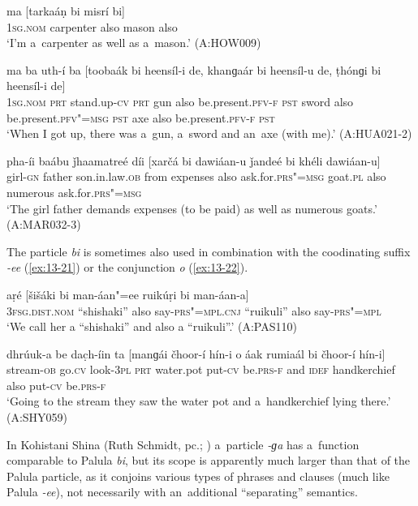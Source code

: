 \begin{exe}
\ex
\label{ex:13-18}
\gll ma [tarkaáṇ bi misrí bi]  \\
\textsc{1sg.nom} carpenter also mason also \\
\glt `I'm a~carpenter as well as a~mason.' (A:HOW009)

\ex
\label{ex:13-19}
\gll ma ba uth-í ba [toobaák bi heensíl-i de, khanɡaár bi heensíl-u de, ṭhónɡi bi heensíl-i de] \\
\textsc{1sg.nom} \textsc{prt} stand.up-\textsc{cv} \textsc{prt} gun also  be.present.\textsc{pfv-f} \textsc{pst} sword also be.present.\textsc{pfv"=msg } \textsc{pst} axe also be.present.\textsc{pfv-f } \textsc{pst} \\
\glt `When I got up, there was a~gun, a~sword and an~axe (with me).' (A:HUA021-2)

\ex
\label{ex:13-20}
\gll pha-íi baábu ǰhaamatreé díi [xarčá bi dawiáan-u ǰandeé bi khéli dawiáan-u]  \\
girl-\textsc{gn} father son.in.law.\textsc{ob} from expenses also  ask.for.\textsc{prs"=msg} goat.\textsc{pl} also numerous ask.for.\textsc{prs"=msg} \\
\glt `The girl father demands expenses (to be paid) as well as numerous goats.' (A:MAR032-3) 
\end{exe}

The particle \textit{bi} is sometimes also used in combination with the coodinating suffix \textit{-ee} (\ref{ex:13-21}) or the conjunction \textit{o} (\ref{ex:13-22}).

\begin{exe}
\ex
\label{ex:13-21}
\gll aṛé  [šišáki  bi man-áan"=ee  ruikúṛi bi man-áan-a] \\
\textsc{3fsg.dist.nom} ``shishaki'' also say-\textsc{prs"=mpl.cnj}  ``ruikuli'' also say-\textsc{prs"=mpl} \\
\glt `We call her a ``shishaki'' and also a ``ruikuli''.' (A:PAS110)

\ex
\label{ex:13-22}
\gll dhrúuk-a be dac̣h-íin ta [manɡái čhoor-í hín-i o áak rumiaál bi čhoor-í hín-i]  \\
stream-\textsc{ob} go.\textsc{cv} look-\textsc{3pl} \textsc{prt} water.pot put-\textsc{cv}  be.\textsc{prs-f} and \textsc{idef } handkerchief also put-\textsc{cv} be.\textsc{prs-f } \\
\glt `Going to the stream they saw the water pot and a~handkerchief lying there.' (A:SHY059) 
\end{exe}

In Kohistani Shina (Ruth Schmidt, pc.; \citealt[252]{schmidtkohistani2008}) a~particle \textit{-ɡa} has a~function comparable to Palula \textit{bi}, but its scope is apparently much larger than that of the Palula particle, as it conjoins various types of phrases and clauses (much like Palula \textit{-ee}), not necessarily with an~additional ``separating'' semantics. 



